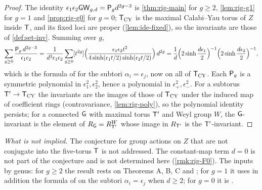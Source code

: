 \begin{proof}
The identity $\epsilon_1\epsilon_2\mathsf{GW}_{g,d}=\mathsf{P}_{g} d^{2g-3}$ is \cref{thm:rig-main} for $g\geq 2$, \cref{lem:rig-g1} for $g=1$ and \cref{prop:rig-g0} for $g=0$; $\mathsf{T}_{\mathrm{CY}}$ is the maximal Calabi--Yau torus of $Z$ inside $\mathsf{T}$, and its fixed loci are proper (\cref{lem:ide-fixed}), so the invariants are those of \cref{def:set-inv}. Summing over $g$,
\[
\sum_{g\geq 0}\frac{\mathsf{P}_{g}\,d^{2g-3}}{\epsilon_1\epsilon_2}=\frac{1}{d^3\epsilon_1\epsilon_2}\sum_{g\geq 0}[t^{2g}]\Big(\frac{\epsilon_1\epsilon_2t^2}{4\sinh(\epsilon_1t/2)\sinh(\epsilon_2t/2)}\Big)\,d^{2g}
=\frac{1}{d}\Big(2\sinh\frac{d\epsilon_1}{2}\Big)^{-1}\Big(2\sinh\frac{d\epsilon_2}{2}\Big)^{-1},
\]
which is the formula of \cite{BS} for the subtori $\alpha_i=\epsilon_j$, now on all of $\mathsf{T}_{\mathrm{CY}}$.  Each $\mathsf{P}_{g}$ is a symmetric polynomial in $\epsilon_1^2,\epsilon_2^2$, hence a polynomial in $\epsilon_+^2,\epsilon_-^2$. For a subtorus $\mathsf{T}'\to\mathsf{T}_{\mathrm{CY}}$ the invariants are the images of those of $\mathsf{T}_{\mathrm{CY}}$ under the induced map of coefficient rings (contravariance, \cref{lem:rig-poly}), so the polynomial identity persists; for a connected $\mathsf{G}$ with maximal torus $\mathsf{T}'$ and Weyl group $W$, the $\mathsf{G}$-invariant is the element of $R_{\mathsf{G}}=R_{\mathsf{T}'}^{W}$ whose image in $R_{\mathsf{T}'}$ is the $\mathsf{T}'$-invariant. 
\end{proof}

\emph{What is not implied.} The conjecture for group actions on $Z$ that are not conjugate into the five-torus $\mathsf{T}$ is not addressed. The constant-map term $d=0$ is not part of the conjecture and is not determined here (\cref{rmk:rig-F0}). The inputs by genus: for $g\geq 2$ the result rests on Theorems A, B, C and \cite{GP99}; for $g=1$ it uses in addition the formula of \cite{BS} on the subtori $\alpha_i=\epsilon_j$ when $d\geq 2$; for $g=0$ it is \cite[p.~3]{FP00}.

